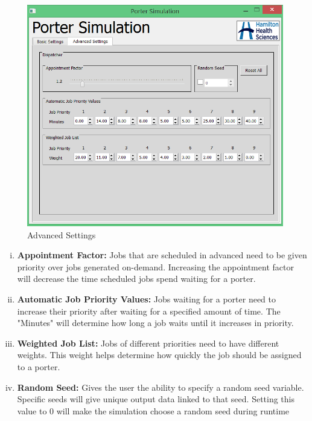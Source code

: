 \documentclass[paper=letter, fontsize=10pt]{scrartcl}
\numberwithin{equation}{section}		%
\numberwithin{figure}{section}			%
\numberwithin{table}{section}				%
\begin{document}
	\begin{figure}[!htbp]
	\begin{center}
		\includegraphics[width=1\columnwidth, height=0.48\textheight, keepaspectratio]{AdvancedSettings.png}
		\caption{Advanced Settings}
	\end{center}
	\end{figure} 
	\begin{enumerate}[(i)]
		\item \textbf{Appointment Factor:} Jobs that are scheduled in advanced need to be given priority over jobs generated on-demand.  Increasing the appointment factor will decrease the time scheduled jobs spend waiting for a porter.
		\item \textbf{Automatic Job Priority Values:} Jobs waiting for a porter need to increase their priority after waiting for a specified amount of time.  The "Minutes" will determine how long a job waits until it increases in priority.
		\item \textbf{Weighted Job List:} Jobs of different priorities need to have different weights.  This weight helps determine how quickly the job should be assigned to a porter.
		\item \textbf{Random Seed:} Gives the user the ability to specify a random seed variable. Specific seeds will give unique output data linked to that seed. Setting this value to 0 will make the simulation choose a random seed during runtime
	\end{enumerate}
	
\end{document}
